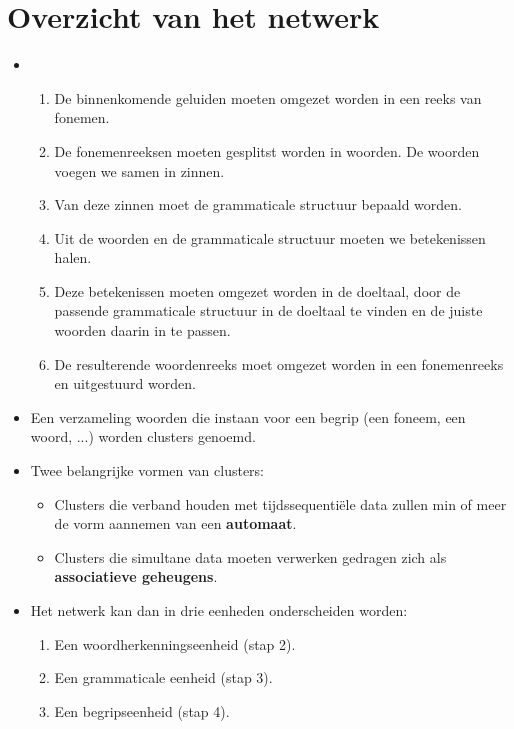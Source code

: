 \section{Overzicht van het netwerk}
\begin{itemize}
    \item \begin{enumerate}
        \item De binnenkomende geluiden moeten omgezet worden in een reeks van fonemen.
        \item De fonemenreeksen moeten gesplitst worden in woorden. De woorden voegen we samen in zinnen.
        \item Van deze zinnen moet de grammaticale structuur bepaald worden.
        \item Uit de woorden en de grammaticale structuur moeten we betekenissen halen.
        \item Deze betekenissen moeten omgezet worden in de doeltaal, door de passende grammaticale structuur in de doeltaal te vinden en de juiste woorden daarin in te passen.
        \item De resulterende woordenreeks moet omgezet worden in een fonemenreeks en uitgestuurd worden.
    \end{enumerate}
    \item Een verzameling woorden die instaan voor een begrip (een foneem, een woord, ...) worden clusters genoemd.
    \item Twee belangrijke vormen van clusters:
    \begin{itemize}
        \item Clusters die verband houden met tijdssequentiële data zullen min of meer de vorm aannemen van een \textbf{automaat}.
        \item Clusters die simultane data moeten verwerken gedragen zich als \textbf{associatieve geheugens}.
    \end{itemize}
    \item Het netwerk kan dan in drie eenheden onderscheiden worden:
    \begin{enumerate}
        \item Een woordherkenningseenheid (stap 2).
        \item Een grammaticale eenheid (stap 3).
        \item Een begripseenheid (stap 4).
    \end{enumerate}
    
\end{itemize}

